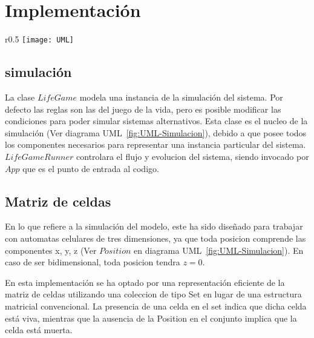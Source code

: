 \section{Implementación}\label{sec:implementacion}

\begin{wrapfigure}{r}{0.5\textwidth}
    \centering
    \texttt{[image: UML]}
    \caption{Diagrama UML}
    \label{fig:UML-Simulacion}
\end{wrapfigure}

\subsection{simulación}\label{label:simulacion}
    La clase $LifeGame$ modela una instancia de la simulación del sistema. Por defecto las reglas son las del juego de la vida,
    pero es posible modificar las condiciones para poder simular sistemas alternativos. Esta clase es el nucleo de la
    simulación (Ver diagrama UML~\ref{fig:UML-Simulacion}), debido a que posee todos los componentes necesarios
    para representar una instancia particular del sistema. $LifeGameRunner$ controlara el flujo y evolucion del sistema,
    siendo invocado por $App$ que es el punto de entrada al codigo.

\subsection{Matriz de celdas}\label{subsec:matriz de celdas}
    En lo que refiere a la simulación del modelo, este ha sido diseñado para trabajar con automatas celulares de tres
    dimensiones, ya que toda posicion comprende las componentes x, y, z (Ver $Position$ en diagrama UML~\ref{fig:UML-Simulacion}).
    En caso de ser bidimensional, toda posicion tendra $z = 0$.

    En esta implementación se ha optado por una representación eficiente de la matriz de celdas utilizando una coleccion de
    tipo Set en lugar de una estructura matricial convencional.
    La presencia de una celda en el set indica que dicha celda está viva, mientras que la ausencia de la Position en
    el conjunto implica que la celda está muerta.


